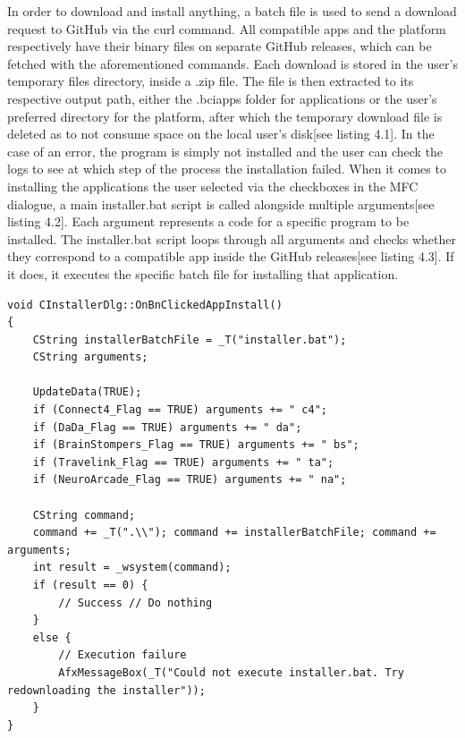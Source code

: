 In order to download and install anything, a batch file is used to send a download request to GitHub via the curl command. All compatible apps and the platform respectively have their binary files on separate GitHub releases, which can be fetched with the aforementioned commands. Each download is stored in the user's temporary files directory, inside a .zip file. The file is then extracted to its respective output path, either the .bciapps folder for applications or the user's preferred directory for the platform, after which the temporary download file is deleted as to not consume space on the local user's disk[see listing 4.1]. In the case of an error, the program is simply not installed and the user can check the logs to see at which step of the process the installation failed.
\vspace{\baselineskip}\newline
When it comes to installing the applications the user selected via the checkboxes in the MFC dialogue, a main installer.bat script is called alongside multiple arguments[see listing 4.2]. Each argument represents a code for a specific program to be installed. The installer.bat script loops through all arguments and checks whether they correspond to a compatible app inside the GitHub releases[see listing 4.3]. If it does, it executes the specific batch file for installing that application.

\begin{lstlisting}[language={[Sharp]C}, caption={Action Handler for the Install Apps button}, label={Script}]
void CInstallerDlg::OnBnClickedAppInstall()
{
	CString installerBatchFile = _T("installer.bat");
	CString arguments;

	UpdateData(TRUE);
	if (Connect4_Flag == TRUE) arguments += " c4";
	if (DaDa_Flag == TRUE) arguments += " da";
	if (BrainStompers_Flag == TRUE) arguments += " bs";
	if (Travelink_Flag == TRUE) arguments += " ta";
	if (NeuroArcade_Flag == TRUE) arguments += " na";

	CString command;
	command += _T(".\\"); command += installerBatchFile; command += arguments;
	int result = _wsystem(command);
	if (result == 0) {
		// Success // Do nothing
	}
	else {
		// Execution failure
		AfxMessageBox(_T("Could not execute installer.bat. Try redownloading the installer"));
	}
}
\end{lstlisting}

